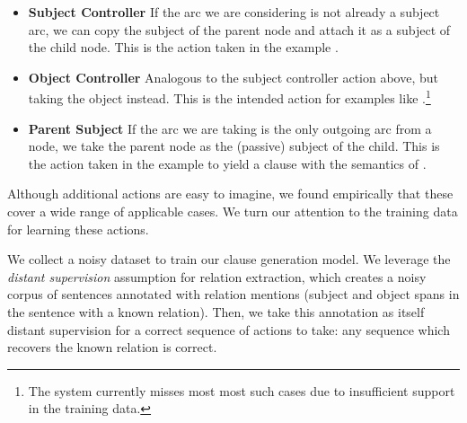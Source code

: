 \vspace{-1ex}
\begin{itemize}[leftmargin=2ex]
\item[] \textbf{Subject Controller}  \hspace{1ex}
  If the arc we are considering is not already a subject arc,
    we can copy the subject of the parent node and attach it as a subject of the
    child node.
  This is the action taken in the example
    .

\item[] \textbf{Object Controller}  \hspace{1ex}
  Analogous to the subject controller action above, but taking the object
    instead.
  This is the intended action for examples like
    .\footnote{
      The system currently misses most most such cases due to insufficient 
      support in the training data.
    }

\item[] \textbf{Parent Subject} \hspace{1ex}
  If the arc we are taking is the only outgoing arc from a node, we take the
    parent node as the (passive) subject of the child.
  This is the action taken in the example
     to yield a clause with the
    semantics of .
\end{itemize}

Although additional actions are easy to imagine, we found empirically that
  these cover a wide range of applicable cases.
We turn our attention to the training data for learning these actions.

%
%
We collect a noisy dataset to train our clause generation model.
We leverage the \textit{distant supervision} assumption for relation extraction,
  which creates a noisy corpus of sentences annotated with relation mentions
  (subject and object spans in the sentence with a known relation).
Then, we take this annotation as itself distant supervision for a correct
  sequence of actions to take: any sequence which recovers the 
  known relation is correct.

